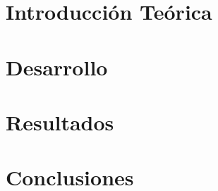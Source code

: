 \documentclass[11pt,a4paper]{article}
\begin{document}
\maketitle

\tableofcontents

\newpage

\section{Introducción Te\'orica}



\section{Desarrollo}



\section{Resultados}



\section{Conclusiones}


\newpage


\newpage


\end{document}
